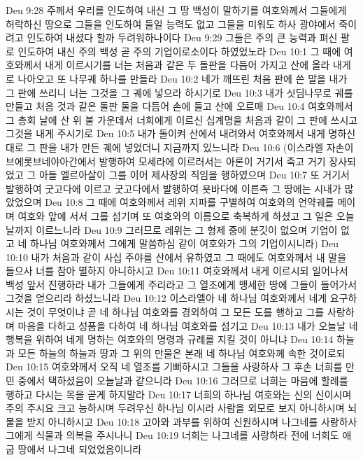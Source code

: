 Deu 9:28  주께서 우리를 인도하여 내신 그 땅 백성이 말하기를 여호와께서 그들에게 허락하신 땅으로 그들을 인도하여 들일 능력도 없고 그들을 미워도 하사 광야에서 죽이려고 인도하여 내셨다 할까 두려워하나이다
Deu 9:29  그들은 주의 큰 능력과 펴신 팔로 인도하여 내신 주의 백성 곧 주의 기업이로소이다 하였었노라
Deu 10:1  그 때에 여호와께서 내게 이르시기를 너는 처음과 같은 두 돌판을 다듬어 가지고 산에 올라 내게로 나아오고 또 나무궤 하나를 만들라
Deu 10:2  네가 깨뜨린 처음 판에 쓴 말을 내가 그 판에 쓰리니 너는 그것을 그 궤에 넣으라 하시기로
Deu 10:3  내가 싯딤나무로 궤를 만들고 처음 것과 같은 돌판 둘을 다듬어 손에 들고 산에 오르매
Deu 10:4  여호와께서 그 총회 날에 산 위 불 가운데서 너희에게 이르신 십계명을 처음과 같이 그 판에 쓰시고 그것을 내게 주시기로
Deu 10:5  내가 돌이켜 산에서 내려와서 여호와께서 내게 명하신 대로 그 판을 내가 만든 궤에 넣었더니 지금까지 있느니라
Deu 10:6  (이스라엘 자손이 브에롯브네야아간에서 발행하여 모세라에 이르러서는 아론이 거기서 죽고 거기 장사되었고 그 아들 엘르아살이 그를 이어 제사장의 직임을 행하였으며
Deu 10:7  또 거기서 발행하여 굿고다에 이르고 굿고다에서 발행하여 욧바다에 이른즉 그 땅에는 시내가 많았었으며
Deu 10:8  그 때에 여호와께서 레위 지파를 구별하여 여호와의 언약궤를 메이며 여호와 앞에 서서 그를 섬기며 또 여호와의 이름으로 축복하게 하셨고 그 일은 오늘날까지 이르느니라
Deu 10:9  그러므로 레위는 그 형제 중에 분깃이 없으며 기업이 없고 네 하나님 여호와께서 그에게 말씀하심 같이 여호와가 그의 기업이시니라)
Deu 10:10  내가 처음과 같이 사십 주야를 산에서 유하였고 그 때에도 여호와께서 내 말을 들으사 너를 참아 멸하지 아니하시고
Deu 10:11  여호와께서 내게 이르시되 일어나서 백성 앞서 진행하라 내가 그들에게 주리라고 그 열조에게 맹세한 땅에 그들이 들어가서 그것을 얻으리라 하셨느니라
Deu 10:12  이스라엘아 네 하나님 여호와께서 네게 요구하시는 것이 무엇이냐 곧 네 하나님 여호와를 경외하여 그 모든 도를 행하고 그를 사랑하며 마음을 다하고 성품을 다하여 네 하나님 여호와를 섬기고
Deu 10:13  내가 오늘날 네 행복을 위하여 네게 명하는 여호와의 명령과 규례를 지킬 것이 아니냐
Deu 10:14  하늘과 모든 하늘의 하늘과 땅과 그 위의 만물은 본래 네 하나님 여호와께 속한 것이로되
Deu 10:15  여호와께서 오직 네 열조를 기뻐하시고 그들을 사랑하사 그 후손 너희를 만민 중에서 택하셨음이 오늘날과 같으니라
Deu 10:16  그러므로 너희는 마음에 할례를 행하고 다시는 목을 곧게 하지말라
Deu 10:17  너희의 하나님 여호와는 신의 신이시며 주의 주시요 크고 능하시며 두려우신 하나님 이시라 사람을 외모로 보지 아니하시며 뇌물을 받지 아니하시고
Deu 10:18  고아와 과부를 위하여 신원하시며 나그네를 사랑하사 그에게 식물과 의복을 주시나니
Deu 10:19  너희는 나그네를 사랑하라 전에 너희도 애굽 땅에서 나그네 되었었음이니라
